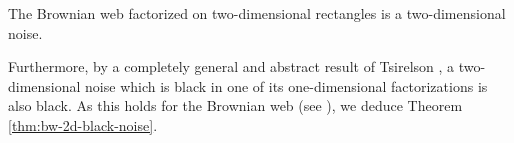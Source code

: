 {\begin{proposition*}
The Brownian web factorized on two-dimensional
rectangles is a two-dimensional noise.
\end{proposition*}

Furthermore, by a completely general and abstract result
of Tsirelson , a two-dimensional noise which is
black in one of its one-dimensional factorizations is also
black. As this holds for the Brownian web (see ),
we deduce Theorem \ref{thm:bw-2d-black-noise}.
}
